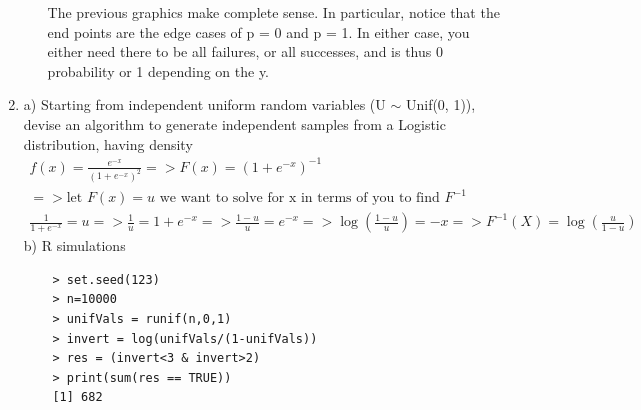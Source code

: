 \documentclass[11pt]{article}
\begin{document}
\begin{enumerate}
\begin{enumerate}
\begin{figure}[H]
	\end{figure}
	The previous graphics make complete sense. In particular, notice that the end points are the edge cases of p = 0 and p = 1. In either case, you either need there to be all failures, or all successes, and is thus 0 probability or 1 depending on the y.
\end{enumerate}
\item a) Starting from independent uniform random variables (U $\sim$ Unif(0, 1)), devise an algorithm to generate independent samples from a Logistic distribution, having density
\begin{gather}
	f(x) = \frac{e^{-x}}{(1+e^{-x})^2} => F(x) = (1+e^{-x})^{-1}\\
	=> \text{let } F(x) = u \text{ we want to solve for x in terms of you to find  } F^{-1} \\
	\frac{1}{1+e^{-x}} = u => \frac{1}{u} = 1+e^{-x} => \frac{1-u}{u} = e^{-x} => \log(\frac{1-u}{u}) = -x => F^{-1}(X) = \log(\frac{u}{1-u})
\end{gather}
b) R simulations
\begin{verbatim}
	> set.seed(123)
	> n=10000
	> unifVals = runif(n,0,1)
	> invert = log(unifVals/(1-unifVals))
	> res = (invert<3 & invert>2)
	> print(sum(res == TRUE))
	[1] 682
\end{verbatim}
\end{enumerate}
\end{document}
